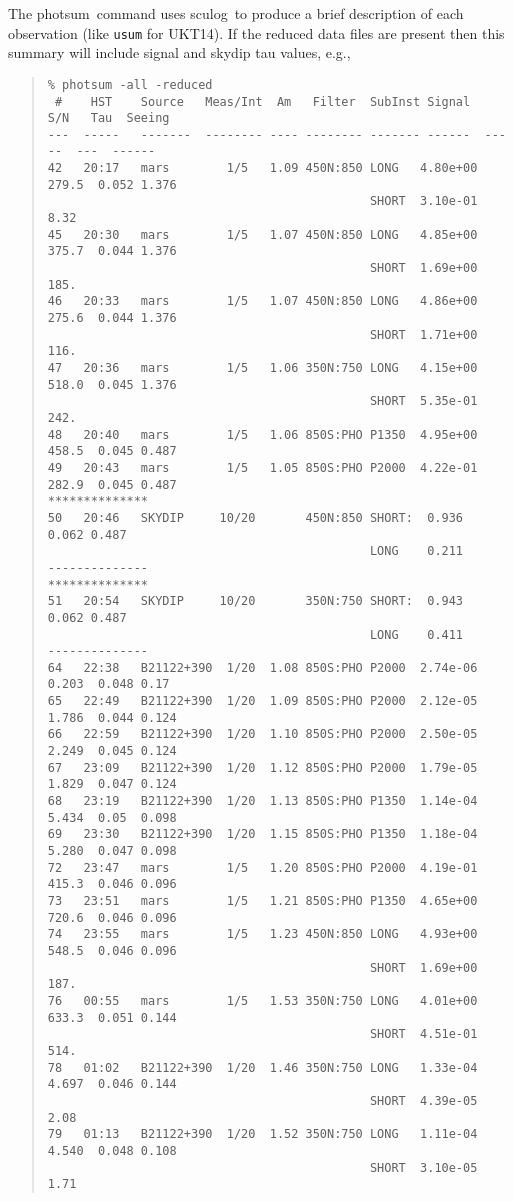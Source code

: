 \documentclass[twoside,11pt,fleqn]{article}
\newenvironment{myquote}{\begin{quote}\begin{small}}{\end{small}\end{quote}}
\newcommand{\task}[1]{{\sf #1}}
\newcommand{\sculog}{\xref{\task{sculog}}{sun216}{SCULOG}}
\newcommand{\photsum}{\xref{\task{photsum}}{sun216}{PHOTSUM}}
\newcommand{\xref}[3]{#1}
\begin{document}
The \photsum\ command uses \sculog\ to produce a brief description
of each observation (like {\tt usum} for UKT14). If the reduced data
files are present then this summary will include signal and
\xref{skydip}{sun216}{skydips} tau values, e.g.,
\begin{myquote}
\begin{verbatim}
% photsum -all -reduced
 #    HST    Source   Meas/Int  Am   Filter  SubInst Signal   S/N   Tau  Seeing
---  -----   -------  -------- ---- -------- ------- ------  -----  ---  ------
42   20:17   mars        1/5   1.09 450N:850 LONG   4.80e+00 279.5  0.052 1.376
                                             SHORT  3.10e-01 8.32
45   20:30   mars        1/5   1.07 450N:850 LONG   4.85e+00 375.7  0.044 1.376
                                             SHORT  1.69e+00 185.
46   20:33   mars        1/5   1.07 450N:850 LONG   4.86e+00 275.6  0.044 1.376
                                             SHORT  1.71e+00 116.
47   20:36   mars        1/5   1.06 350N:750 LONG   4.15e+00 518.0  0.045 1.376
                                             SHORT  5.35e-01 242.
48   20:40   mars        1/5   1.06 850S:PHO P1350  4.95e+00 458.5  0.045 0.487
49   20:43   mars        1/5   1.05 850S:PHO P2000  4.22e-01 282.9  0.045 0.487
**************
50   20:46   SKYDIP     10/20       450N:850 SHORT:  0.936          0.062 0.487
                                             LONG    0.211
--------------
**************
51   20:54   SKYDIP     10/20       350N:750 SHORT:  0.943          0.062 0.487
                                             LONG    0.411
--------------
64   22:38   B21122+390  1/20  1.08 850S:PHO P2000  2.74e-06 0.203  0.048 0.17
65   22:49   B21122+390  1/20  1.09 850S:PHO P2000  2.12e-05 1.786  0.044 0.124
66   22:59   B21122+390  1/20  1.10 850S:PHO P2000  2.50e-05 2.249  0.045 0.124
67   23:09   B21122+390  1/20  1.12 850S:PHO P2000  1.79e-05 1.829  0.047 0.124
68   23:19   B21122+390  1/20  1.13 850S:PHO P1350  1.14e-04 5.434  0.05  0.098
69   23:30   B21122+390  1/20  1.15 850S:PHO P1350  1.18e-04 5.280  0.047 0.098
72   23:47   mars        1/5   1.20 850S:PHO P2000  4.19e-01 415.3  0.046 0.096
73   23:51   mars        1/5   1.21 850S:PHO P1350  4.65e+00 720.6  0.046 0.096
74   23:55   mars        1/5   1.23 450N:850 LONG   4.93e+00 548.5  0.046 0.096
                                             SHORT  1.69e+00 187.
76   00:55   mars        1/5   1.53 350N:750 LONG   4.01e+00 633.3  0.051 0.144
                                             SHORT  4.51e-01 514.
78   01:02   B21122+390  1/20  1.46 350N:750 LONG   1.33e-04 4.697  0.046 0.144
                                             SHORT  4.39e-05 2.08
79   01:13   B21122+390  1/20  1.52 350N:750 LONG   1.11e-04 4.540  0.048 0.108
                                             SHORT  3.10e-05 1.71
\end{verbatim}
\end{myquote}
\end{document}
